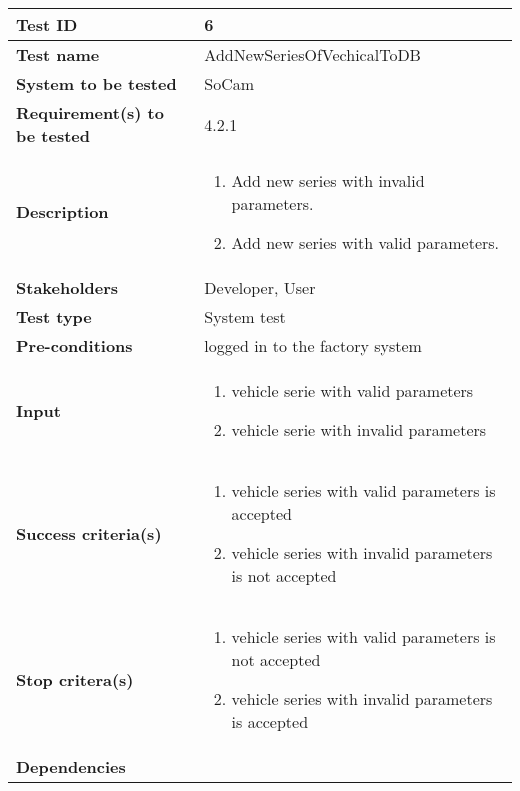 				\begin{table}[H]
			\begin{tabular}{| p{4cm} | p{10cm} |}
			\hline
			\rowcolor{gray}
				{\bf Test ID} & 6 \\ \hline
				{\bf Test name} & AddNewSeriesOfVechicalToDB \\ \hline
				{\bf System to be tested} & SoCam \\ \hline
				{\bf Requirement(s) to be tested} & 4.2.1 \\ \hline
				{\bf Description} & 
					\begin{enumerate}
						\item Add new series with invalid parameters.
						\item Add new series with valid parameters.
					\end{enumerate}
				\\ \hline
				{\bf Stakeholders} & Developer, User \\ \hline
				{\bf Test type} & System test \\ \hline
				{\bf Pre-conditions} & logged in to the factory system \\ \hline
				{\bf Input} & 
					\begin{enumerate}
						\item vehicle serie with valid parameters
						\item vehicle serie with invalid parameters
					\end{enumerate}
				\\ \hline
				{\bf Success criteria(s)} & 
					\begin{enumerate}
						\item vehicle series with valid parameters is accepted
						\item vehicle series with invalid parameters is not accepted
					\end{enumerate}
				\\ \hline
				{\bf Stop critera(s)} &  
					\begin{enumerate}
						\item vehicle series with valid parameters is not accepted
						\item vehicle series with invalid parameters is accepted
					\end{enumerate} \\ \hline
				{\bf Dependencies} & \\ \hline
			\end{tabular}
		\end{table}


